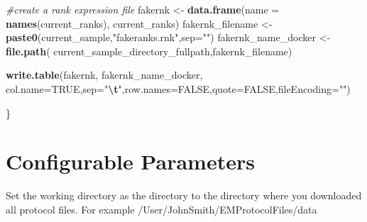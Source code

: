 \documentclass[
]{book}
\newenvironment{Shaded}{\begin{snugshade}}{\end{snugshade}}
\newcommand{\AttributeTok}[1]{\textcolor[rgb]{0.13,0.29,0.53}{#1}}
\newcommand{\CommentTok}[1]{\textcolor[rgb]{0.56,0.35,0.01}{\textit{#1}}}
\newcommand{\ConstantTok}[1]{\textcolor[rgb]{0.56,0.35,0.01}{#1}}
\newcommand{\ControlFlowTok}[1]{\textcolor[rgb]{0.13,0.29,0.53}{\textbf{#1}}}
\newcommand{\FunctionTok}[1]{\textcolor[rgb]{0.13,0.29,0.53}{\textbf{#1}}}
\newcommand{\NormalTok}[1]{#1}
\newcommand{\OtherTok}[1]{\textcolor[rgb]{0.56,0.35,0.01}{#1}}
\newcommand{\SpecialCharTok}[1]{\textcolor[rgb]{0.81,0.36,0.00}{\textbf{#1}}}
\newcommand{\StringTok}[1]{\textcolor[rgb]{0.31,0.60,0.02}{#1}}
\begin{document}
\begin{Shaded}
\begin{Highlighting}[]
    
    \CommentTok{\#create a rank expression file}
\NormalTok{    fakernk }\OtherTok{\textless{}{-}} \FunctionTok{data.frame}\NormalTok{(}\AttributeTok{name =} \FunctionTok{names}\NormalTok{(current\_ranks), }
\NormalTok{                          current\_ranks)}
\NormalTok{    fakernk\_filename }\OtherTok{\textless{}{-}} \FunctionTok{paste0}\NormalTok{(current\_sample,}\StringTok{"fakeranks.rnk"}\NormalTok{,}\AttributeTok{sep=}\StringTok{""}\NormalTok{)}
\NormalTok{    fakernk\_name\_docker }\OtherTok{\textless{}{-}} \FunctionTok{file.path}\NormalTok{( current\_sample\_directory\_fullpath,fakernk\_filename)}

    \FunctionTok{write.table}\NormalTok{(fakernk,}
\NormalTok{                fakernk\_name\_docker,}
                \AttributeTok{col.name=}\ConstantTok{TRUE}\NormalTok{,}\AttributeTok{sep=}\StringTok{"}\SpecialCharTok{\textbackslash{}t}\StringTok{"}\NormalTok{,}\AttributeTok{row.names=}\ConstantTok{FALSE}\NormalTok{,}\AttributeTok{quote=}\ConstantTok{FALSE}\NormalTok{,}\AttributeTok{fileEncoding=}\StringTok{""}\NormalTok{)}
    
      
\NormalTok{\}}
\end{Highlighting}
\end{Shaded}

\section{Configurable Parameters}\label{configurable-parameters-1}

Set the working directory as the directory to the directory where you downloaded all protocol files. For example /User/JohnSmith/EMProtocolFiles/data

\begin{Shaded}
\end{Shaded}
\end{document}

